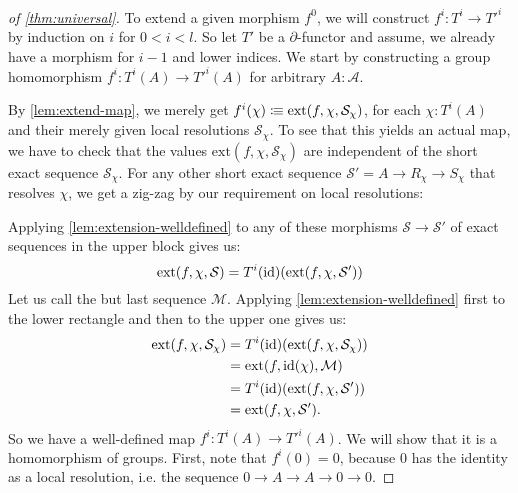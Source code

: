 \begin{proof}[of \cref{thm:universal}]
  To extend a given morphism $f^0$, 
  we will construct $f^i:T^i\to T'^i$ by induction on $i$ for $0<i<l$.
  So let $T'$ be a $\partial$-functor and assume, we already have a morphism for $i-1$ and lower indices.
  We start by constructing a group homomorphism $f^i:T^i(A)\to T'^i(A)$ for arbitrary $A:\mathcal A$.

  By \cref{lem:extend-map},
  we merely get $f^{i}(\chi)\vcentcolon\mspace{-1.2mu}\equiv \mathrm{ext}(f,\chi,\mathcal{S}_\chi)$,
  for each $\chi:T^i(A)$ and their merely given local resolutions $\mathcal{S}_\chi$.
  To see that this yields an actual map, we have to check that the
  values $\mathrm{ext}(f,\chi,\mathcal{S}_\chi)$ are independent of the short exact sequence $\mathcal{S}_\chi$.
  For any other short exact sequence $\mathcal{S}'=A\to R_\chi\to S_\chi$
  that resolves $\chi$, we get a zig-zag by our requirement on local resolutions:
  \begin{center}
  \end{center}
  Applying \cref{lem:extension-welldefined} to any of these morphisms $\mathcal{S}\to\mathcal{S}'$ of exact sequences
  in the upper block gives us:
  \[ \mathrm{ext}(f,\chi,\mathcal{S}) = T^i(\mathrm{id})(\mathrm{ext}(f,\chi,\mathcal{S}')) \]
  Let us call the but last sequence $\mathcal{M}$.
  Applying \cref{lem:extension-welldefined} first to the lower rectangle and then to the upper one gives us:
  \begin{align*}
    \mathrm{ext}(f,\chi,\mathcal{S}_\chi) &= T^i(\id)(\mathrm{ext}(f,\chi,\mathcal{S}_\chi)) \\
                                          &=\mathrm{ext}(f,\id(\chi),\mathcal{M}) \\
                                          &=T^i(\id)(\mathrm{ext}(f,\chi,\mathcal{S}')) \\
                                          &=\mathrm{ext}(f,\chi,\mathcal{S}')
                                            \rlap{.}
  \end{align*}
  So we have a well-defined map $f^{i}:T^i(A)\to T'^i(A)$.
  We will show that it is a homomorphism of groups.
  First, note that $f^i(0)=0$,
  because $0$ has the identity as a local resolution, i.e. the sequence $0\to A\to A\to 0\to 0$.
  

\end{proof}
